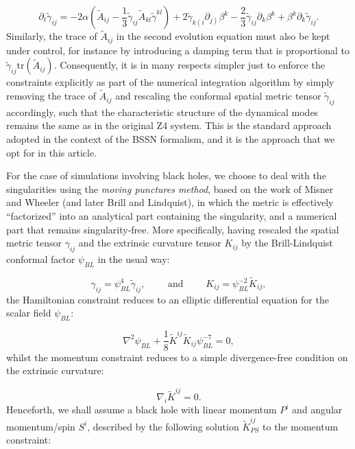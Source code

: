 \documentclass{article}
\begin{document}
\begin{equation}
\partial_t \tilde{\gamma}_{i j} = -2 \alpha \left( \tilde{A}_{i j} - \frac{1}{3} \tilde{\gamma}_{i j} \tilde{A}_{k l} \tilde{\gamma}^{k l} \right) + 2 \tilde{\gamma}_{k \left( i \right.} \partial_{\left. j \right)} \beta^k - \frac{2}{3} \tilde{\gamma}_{i j} \partial_k \beta^k + \beta^k \partial_k \tilde{\gamma}_{i j}.
\end{equation}
Similarly, the trace of ${\tilde{A}_{i j}}$ in the second evolution equation must also be kept under control, for instance by introducing a damping term that is proportional to ${\tilde{\gamma}_{i j} \mathrm{tr} \left( \tilde{A}_{i j} \right)}$. Consequently, it is in many respects simpler just to enforce the constraints explicitly as part of the numerical integration algorithm by simply removing the trace of ${\tilde{A}_{i j}}$ and rescaling the conformal spatial metric tensor ${\tilde{\gamma}_{i j}}$ accordingly, such that the characteristic structure of the dynamical modes remains the same as in the original Z4 system. This is the standard approach adopted in the context of the BSSN formalism, and it is the approach that we opt for in this article.

For the case of simulations involving black holes, we choose to deal with the singularities using the \textit{moving punctures method}\cite{brandt}, based on the work of Misner and Wheeler\cite{misner} (and later Brill and Lindquist\cite{brill}), in which the metric is effectively ``factorized'' into an analytical part containing the singularity, and a numerical part that remains singularity-free. More specifically, having rescaled the spatial metric tensor ${\gamma_{i j}}$ and the extrinsic curvature tensor ${K_{i j}}$ by the Brill-Lindquist conformal factor ${\psi_{BL}}$ in the usual way:

\begin{equation}
\gamma_{i j} = \psi_{BL}^{4} \tilde{\gamma}_{i j}, \qquad \text{ and } \qquad K_{i j} = \psi_{BL}^{-2} \tilde{K}_{i j},
\end{equation}
the Hamiltonian constraint reduces to an elliptic differential equation for the scalar field ${\psi_{BL}}$:

\begin{equation}
\nabla^2 \psi_{BL} + \frac{1}{8} \tilde{K}^{i j} \tilde{K}_{i j} \psi_{BL}^{-7} = 0,
\end{equation}
whilst the momentum constraint reduces to a simple divergence-free condition on the extrinsic curvature:

\begin{equation}
\nabla_i \tilde{K}^{i j} = 0.
\end{equation}
Henceforth, we shall assume a black hole with linear momentum ${P^i}$ and angular momentum/spin ${S^i}$, described by the following solution ${\tilde{K}_{PS}^{i j}}$ to the momentum constraint:
\end{document}

